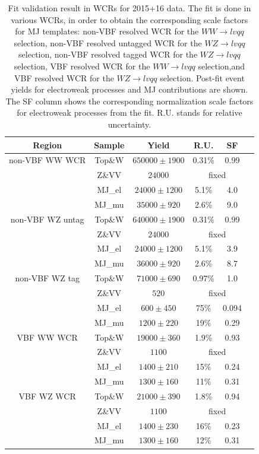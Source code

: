 \begin{table}[ht]
    \centering
     \begin{tabular}{|c|c|c|c|c|c|}
      \hline
     Region &Sample    & Yield   & R.U.    & SF    \\ \hline
     non-VBF WW WCR & Top\&W    & $650000\pm 1900$  & 0.31\%  & 0.99  \\ 
     &Z\&VV     & $24000$ & \multicolumn{2}{c|}{fixed} \\ 
     &MJ\_el    & $24000\pm 1200$  & 5.1\%  &4.0   \\ 
     &MJ\_mu    & $35000\pm 920$  & 2.6\%  &9.0  \\     
      \hline
     non-VBF WZ untag & Top\&W    & $640000\pm 1900$  & 0.31\%  & 0.99  \\
     &Z\&VV     & $24000$ & \multicolumn{2}{c|}{fixed} \\ 
     &MJ\_el    & $24000\pm 1200$  & 5.1\%  &3.9   \\
     &MJ\_mu    & $36000\pm 920$  & 2.6\%  &8.7   \\ 
      \hline
     non-VBF WZ tag&Top\&W    & $71000\pm 690$  & 0.97\%  & 1.0  \\ 
     &Z\&VV     & $520$ & \multicolumn{2}{c|}{fixed} \\ 
     &MJ\_el    & $600\pm 450$  & 75\%  &0.094   \\
     &MJ\_mu    & $1200\pm 220$  & 19\%  &0.29   \\   
      \hline
     VBF WW WCR & Top\&W    & $19000\pm 360$  & 1.9\%  & 0.93  \\ 
     &Z\&VV     & $1100$ & \multicolumn{2}{c|}{fixed} \\ 
     &MJ\_el    & $1400\pm 210$  & 15\%  &0.24   \\ 
     &MJ\_mu    & $1300\pm 160$  & 11\%  &0.31   \\ 
      \hline
     VBF WZ WCR & Top\&W    & $21000\pm 390$  & 1.8\%  & 0.94  \\
     &Z\&VV     & $1100$ & \multicolumn{2}{c|}{fixed} \\
     &MJ\_el    & $1400\pm 230$  & 16\%  &0.23   \\ 
     &MJ\_mu    & $1300\pm 160$  & 12\%  &0.31   \\ 
     \hline
     \end{tabular}\hfill%
     \\
\caption{\label{tab:template_validation_CR} Fit validation result in WCRs for 2015+16 data. 
The fit is done in various WCRs, in order to obtain the corresponding scale factors for MJ templates: non-VBF resolved WCR for the $WW\to lvqq$ selection, non-VBF resolved untagged WCR for the $WZ\to lvqq$ selection,  non-VBF resolved tagged WCR for the $WZ\to lvqq$ selection,  VBF resolved WCR for the $WW\to lvqq$ selection,and VBF resolved WCR for the $WZ\to lvqq$ selection. Post-fit event yields for electroweak processes and MJ contributions are shown. The SF column shows the corresponding normalization scale factors for electroweak processes from the fit.
R.U. stands for relative uncertainty.
}
\end{table}



